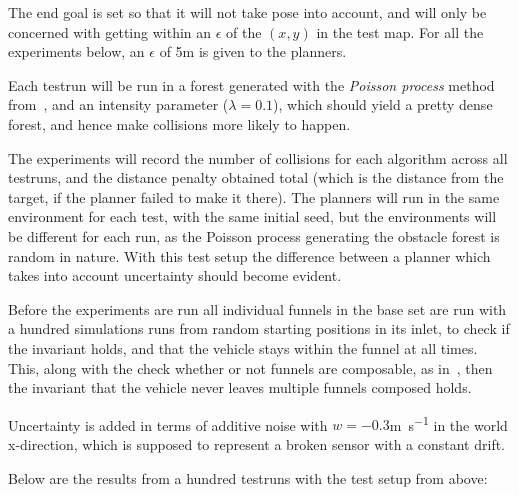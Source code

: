 The end goal is set so that it will not take pose into account, and will only be
concerned with getting within an \(\epsilon\) of the \((x,y)\) in the test map.
For all the experiments below, an \(\epsilon\) of 5\si{\metre} is given to the
planners.

Each testrun will be run in a forest generated with the \textit{Poisson process}
method from~, and an intensity parameter (\(\lambda
= 0.1\)), which should yield a pretty dense forest, and hence make collisions
more likely to happen.

The experiments will record the number of collisions for each algorithm across
all testruns, and the distance penalty obtained total (which is the distance
from the target, if the planner failed to make it there). The planners will run
in the same environment for each test, with the same initial seed, but the
environments will be different for each run, as the Poisson process generating
the obstacle forest is random in nature. With this test setup the difference
between a planner which takes into account uncertainty should become evident.

Before the experiments are run all individual funnels in the base set are run
with a hundred simulations runs from random starting positions in its inlet, to
check if the invariant holds, and that the vehicle stays within the funnel at
all times. This, along with the check whether or not funnels are composable, as
in~, then the invariant that the vehicle never
leaves multiple funnels composed holds.

Uncertainty is added in terms of additive noise with \(w = -0.3\)\si{m.s^{-1}}
in the world x-direction, which is supposed to represent a broken sensor with a
constant drift.

Below are the results from a hundred testruns with the test setup from above:

